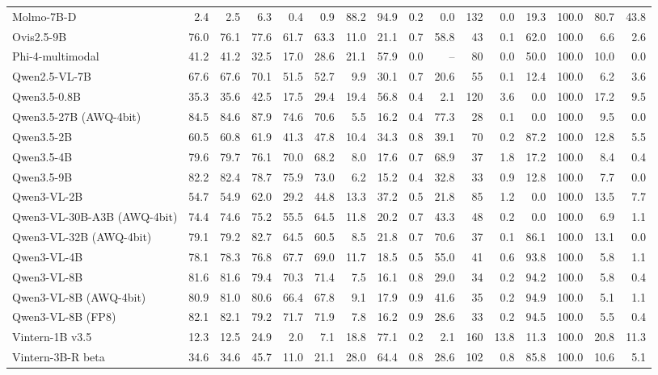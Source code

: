 \begin{table}[t]
\begin{tabular}{lrrrrrrrrrrrrrrr}
Molmo-7B-D & 2.4 & 2.5 & 6.3 & 0.4 & 0.9 & 88.2 & 94.9 & 0.2 & 0.0 & 132 & 0.0 & 19.3 & 100.0 & 80.7 & 43.8 \\
Ovis2.5-9B & 76.0 & 76.1 & 77.6 & 61.7 & 63.3 & 11.0 & 21.1 & 0.7 & 58.8 & 43 & 0.1 & 62.0 & 100.0 & 6.6 & 2.6 \\
Phi-4-multimodal & 41.2 & 41.2 & 32.5 & 17.0 & 28.6 & 21.1 & 57.9 & 0.0 & – & 80 & 0.0 & 50.0 & 100.0 & 10.0 & 0.0 \\
Qwen2.5-VL-7B & 67.6 & 67.6 & 70.1 & 51.5 & 52.7 & 9.9 & 30.1 & 0.7 & 20.6 & 55 & 0.1 & 12.4 & 100.0 & 6.2 & 3.6 \\
Qwen3.5-0.8B & 35.3 & 35.6 & 42.5 & 17.5 & 29.4 & 19.4 & 56.8 & 0.4 & 2.1 & 120 & 3.6 & 0.0 & 100.0 & 17.2 & 9.5 \\
Qwen3.5-27B (AWQ-4bit) & 84.5 & 84.6 & 87.9 & 74.6 & 70.6 & 5.5 & 16.2 & 0.4 & 77.3 & 28 & 0.1 & 0.0 & 100.0 & 9.5 & 0.0 \\
Qwen3.5-2B & 60.5 & 60.8 & 61.9 & 41.3 & 47.8 & 10.4 & 34.3 & 0.8 & 39.1 & 70 & 0.2 & 87.2 & 100.0 & 12.8 & 5.5 \\
Qwen3.5-4B & 79.6 & 79.7 & 76.1 & 70.0 & 68.2 & 8.0 & 17.6 & 0.7 & 68.9 & 37 & 1.8 & 17.2 & 100.0 & 8.4 & 0.4 \\
Qwen3.5-9B & 82.2 & 82.4 & 78.7 & 75.9 & 73.0 & 6.2 & 15.2 & 0.4 & 32.8 & 33 & 0.9 & 12.8 & 100.0 & 7.7 & 0.0 \\
Qwen3-VL-2B & 54.7 & 54.9 & 62.0 & 29.2 & 44.8 & 13.3 & 37.2 & 0.5 & 21.8 & 85 & 1.2 & 0.0 & 100.0 & 13.5 & 7.7 \\
Qwen3-VL-30B-A3B (AWQ-4bit) & 74.4 & 74.6 & 75.2 & 55.5 & 64.5 & 11.8 & 20.2 & 0.7 & 43.3 & 48 & 0.2 & 0.0 & 100.0 & 6.9 & 1.1 \\
Qwen3-VL-32B (AWQ-4bit) & 79.1 & 79.2 & 82.7 & 64.5 & 60.5 & 8.5 & 21.8 & 0.7 & 70.6 & 37 & 0.1 & 86.1 & 100.0 & 13.1 & 0.0 \\
Qwen3-VL-4B & 78.1 & 78.3 & 76.8 & 67.7 & 69.0 & 11.7 & 18.5 & 0.5 & 55.0 & 41 & 0.6 & 93.8 & 100.0 & 5.8 & 1.1 \\
Qwen3-VL-8B & 81.6 & 81.6 & 79.4 & 70.3 & 71.4 & 7.5 & 16.1 & 0.8 & 29.0 & 34 & 0.2 & 94.2 & 100.0 & 5.8 & 0.4 \\
Qwen3-VL-8B (AWQ-4bit) & 80.9 & 81.0 & 80.6 & 66.4 & 67.8 & 9.1 & 17.9 & 0.9 & 41.6 & 35 & 0.2 & 94.9 & 100.0 & 5.1 & 1.1 \\
Qwen3-VL-8B (FP8) & 82.1 & 82.1 & 79.2 & 71.7 & 71.9 & 7.8 & 16.2 & 0.9 & 28.6 & 33 & 0.2 & 94.5 & 100.0 & 5.5 & 0.4 \\
Vintern-1B v3.5 & 12.3 & 12.5 & 24.9 & 2.0 & 7.1 & 18.8 & 77.1 & 0.2 & 2.1 & 160 & 13.8 & 11.3 & 100.0 & 20.8 & 11.3 \\
Vintern-3B-R beta & 34.6 & 34.6 & 45.7 & 11.0 & 21.1 & 28.0 & 64.4 & 0.8 & 28.6 & 102 & 0.8 & 85.8 & 100.0 & 10.6 & 5.1 \\
\bottomrule
\end{tabular}
\end{table}
